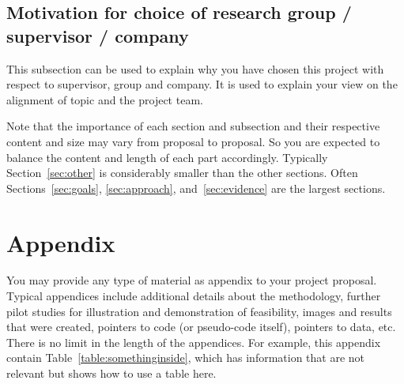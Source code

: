 \documentclass{article}
\begin{document}
\subsection{Motivation for choice of research group / supervisor / company}

This subsection can be used to explain why you have chosen this project with respect to supervisor, group and company. It is used to explain your view on the alignment of topic and the project team.

Note that the importance of each section and subsection and their respective content and size may vary from proposal to proposal. So you are expected to balance the content and length of each part accordingly. Typically Section~\ref{sec:other} is considerably smaller than the other sections. Often Sections~\ref{sec:goals}, \ref{sec:approach}, and~\ref{sec:evidence} are the largest sections.




\appendix
\section{Appendix}

You may provide any type of material as appendix to your project proposal. Typical appendices include additional details about the methodology, further pilot studies for illustration and demonstration of feasibility, images and results that were created, pointers to code (or pseudo-code itself), pointers to data, etc. There is no limit in the length of the appendices. For example, this appendix contain Table~\ref{table:somethinginside}, which has information that are not relevant but shows how to use a table here.
\end{document}
